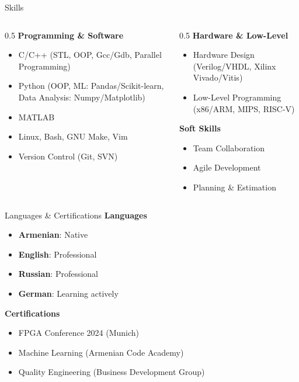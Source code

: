 \begin{frame}{Skills}
    \begin{columns}
        \begin{column}{0.5\textwidth}
            \textbf{Programming \& Software}
            \begin{itemize}
                \item C/C++ (STL, OOP, Gcc/Gdb, Parallel Programming)
                \item Python (OOP, ML: Pandas/Scikit-learn, Data Analysis: Numpy/Matplotlib)
                \item MATLAB
                \item Linux, Bash, GNU Make, Vim
                \item Version Control (Git, SVN)
            \end{itemize}
        \end{column}
        \begin{column}{0.5\textwidth}
            \textbf{Hardware \& Low-Level}
            \begin{itemize}
                \item Hardware Design (Verilog/VHDL, Xilinx Vivado/Vitis)
                \item Low-Level Programming (x86/ARM, MIPS, RISC-V)
            \end{itemize}
            
            \vspace{0.5cm}
            \textbf{Soft Skills}
            \begin{itemize}
                \item Team Collaboration
                \item Agile Development
                \item Planning \& Estimation
            \end{itemize}
        \end{column}
    \end{columns}
\end{frame}

\begin{frame}{Languages \& Certifications}
    \textbf{Languages}
    \begin{itemize}
        \item \textbf{Armenian}: Native
        \item \textbf{English}: Professional
        \item \textbf{Russian}: Professional
        \item \textbf{German}: Learning actively
    \end{itemize}
    
    \vspace{1cm}
    \textbf{Certifications}
    \begin{itemize}
        \item FPGA Conference 2024 (Munich)
        \item Machine Learning (Armenian Code Academy)
        \item Quality Engineering (Business Development Group)
    \end{itemize}
\end{frame}


